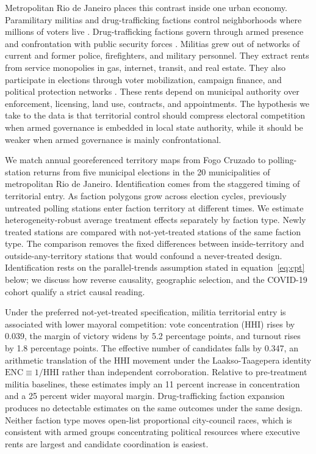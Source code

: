 \documentclass[11pt]{article}
\begin{document}
Metropolitan Rio de Janeiro places this contrast inside one urban economy. Paramilitary militias and drug-trafficking factions control neighborhoods where millions of voters live \citep{monteiro2023enterprises}. Drug-trafficking factions govern through armed presence and confrontation with public security forces \citep{arias2006drugs}. Militias grew out of networks of current and former police, firefighters, and military personnel. They extract rents from service monopolies in gas, internet, transit, and real estate. They also participate in elections through voter mobilization, campaign finance, and political protection networks \citep{pantaleao2025elections}. These rents depend on municipal authority over enforcement, licensing, land use, contracts, and appointments. The hypothesis we take to the data is that territorial control should compress electoral competition when armed governance is embedded in local state authority, while it should be weaker when armed governance is mainly confrontational.

We match annual georeferenced territory maps from Fogo Cruzado to polling-station returns from five municipal elections in the 20 municipalities of metropolitan Rio de Janeiro. Identification comes from the staggered timing of territorial entry. As faction polygons grow across election cycles, previously untreated polling stations enter faction territory at different times. We estimate heterogeneity-robust average treatment effects \citep{callaway2021did} separately by faction type. Newly treated stations are compared with not-yet-treated stations of the same faction type. The comparison removes the fixed differences between inside-territory and outside-any-territory stations that would confound a never-treated design. Identification rests on the parallel-trends assumption stated in equation~\eqref{eq:cpt} below; we discuss how reverse causality, geographic selection, and the COVID-19 cohort qualify a strict causal reading.

Under the preferred not-yet-treated specification, militia territorial entry is associated with lower mayoral competition: vote concentration (HHI) rises by 0.039, the margin of victory widens by 5.2 percentage points, and turnout rises by 1.8 percentage points. The effective number of candidates falls by 0.347, an arithmetic translation of the HHI movement under the Laakso-Taagepera identity $\text{ENC}\equiv 1/\text{HHI}$ rather than independent corroboration. Relative to pre-treatment militia baselines, these estimates imply an 11 percent increase in concentration and a 25 percent wider mayoral margin. Drug-trafficking faction expansion produces no detectable estimates on the same outcomes under the same design. Neither faction type moves open-list proportional city-council races, which is consistent with armed groups concentrating political resources where executive rents are largest and candidate coordination is easiest.
\end{document}
